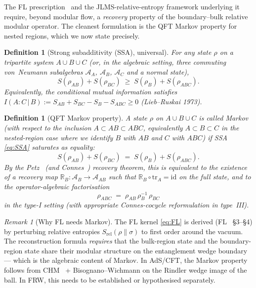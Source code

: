 \documentclass[11pt,a4paper]{article}
\newtheorem{definition}[theorem]{Definition}
\theoremstyle{remark}
\newtheorem{remark}[theorem]{Remark}
\newcommand{\R}{\mathbb{R}}
\newcommand{\A}{\mathcal{A}}
\begin{document}
The FL prescription~\cite{FaulknerLewkowycz2017} and the JLMS-relative-entropy
framework underlying it require, beyond modular flow, a \emph{recovery}
property of the boundary--bulk relative modular operator.  The cleanest
formulation is the QFT Markov property for nested regions, which we now
state precisely.

\begin{definition}[Strong subadditivity (SSA), universal]
\label{def:SSA}
For any state $\rho$ on a tripartite system $A \cup B \cup C$ (or, in the
algebraic setting, three commuting von~Neumann subalgebras
$\A_A$, $\A_B$, $\A_C$ and a normal state),
\begin{equation}
  S(\rho_{AB}) + S(\rho_{BC}) \;\geq\; S(\rho_B) + S(\rho_{ABC}).
\label{eq:SSA}
\end{equation}
Equivalently, the conditional mutual information satisfies
$I(A:C\,|\,B) := S_{AB} + S_{BC} - S_B - S_{ABC} \geq 0$
(Lieb--Ruskai 1973).
\end{definition}

\begin{definition}[QFT Markov property]
\label{def:markov}
A state $\rho$ on $A \cup B \cup C$ is called Markov (with respect to the
inclusion $A \subset AB \subset ABC$, equivalently $A \subset B \subset C$
in the nested-region case where we identify $B$ with $AB$ and $C$ with $ABC$)
if SSA \eqref{eq:SSA} saturates as equality:
\begin{equation}
  S(\rho_{AB}) + S(\rho_{BC}) \;=\; S(\rho_B) + S(\rho_{ABC}).
\label{eq:markov_def}
\end{equation}
By the Petz~\cite{Petz1986} (and Connes~\cite{Connes1975}) recovery theorem,
this is equivalent to the existence of a recovery map $\R_B: \A_B \to \A_{AB}$
such that $\R_B \circ \mathrm{tr}_A = \mathrm{id}$ on the full state, and to
the operator-algebraic factorisation
\begin{equation}
  \rho_{ABC} \;=\; \rho_{AB}\,\rho_B^{-1}\,\rho_{BC}
\label{eq:markov_factor}
\end{equation}
in the type-I setting (with appropriate Connes-cocycle reformulation in
type~III).
\end{definition}

\begin{remark}[Why FL needs Markov]
The FL kernel \eqref{eq:FL} is derived (FL~\cite{FaulknerLewkowycz2017}
\S3--\S4) by perturbing relative entropies $S_{\mathrm{rel}}(\rho \| \sigma)$
to first order around the vacuum.  The reconstruction formula
\emph{requires} that the bulk-region state and the boundary-region state
share their modular structure on the entanglement wedge boundary --- which
is the algebraic content of Markov.  In AdS/CFT, the Markov property
follows from CHM~\cite{CHM2011} + Bisognano--Wichmann on the Rindler
wedge image of the ball.  In FRW, this needs to be established or
hypothesised separately.
\end{remark}
\end{document}
